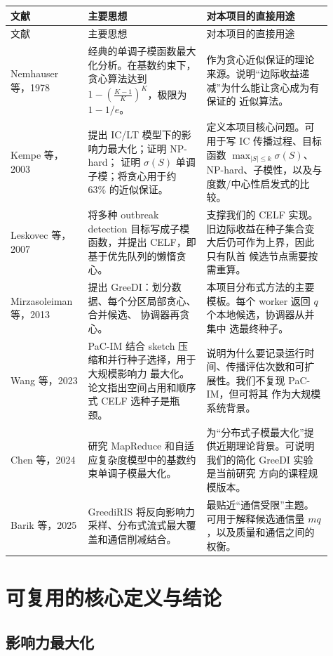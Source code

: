 \documentclass[UTF8,10pt]{ctexart}
\begin{document}
\begin{longtable}{p{0.21\linewidth}p{0.34\linewidth}p{0.36\linewidth}}
\toprule
文献 & 主要思想 & 对本项目的直接用途 \\
\midrule
\endfirsthead
\toprule
文献 & 主要思想 & 对本项目的直接用途 \\
\midrule
\endhead
Nemhauser 等，1978 & 经典的单调子模函数最大化分析。在基数约束下，
贪心算法达到 $1-\left(\frac{K-1}{K}\right)^K$，极限为 $1-1/e$。 &
作为贪心近似保证的理论来源。说明“边际收益递减”为什么能让贪心成为有保证的
近似算法。 \\
\midrule
Kempe 等，2003 & 提出 IC/LT 模型下的影响力最大化；证明 NP-hard；
证明 $\sigma(S)$ 单调子模；将贪心用于约 $63\%$ 的近似保证。 &
定义本项目核心问题。可用于写 IC 传播过程、目标函数
$\max_{|S|\le k}\sigma(S)$、NP-hard、子模性，以及与度数/中心性启发式的比较。 \\
\midrule
Leskovec 等，2007 & 将多种 outbreak detection 目标写成子模函数，并提出
CELF，即基于优先队列的懒惰贪心。 &
支撑我们的 CELF 实现。旧边际收益在种子集合变大后仍可作为上界，因此只有队首
候选节点需要按需重算。 \\
\midrule
Mirzasoleiman 等，2013 & 提出 GreeDI：划分数据、每个分区局部贪心、合并候选、
协调器再贪心。 &
本项目分布式方法的主要模板。每个 worker 返回 $q$ 个本地候选，协调器从并集中
选最终种子。 \\
\midrule
Wang 等，2023 & PaC-IM 结合 sketch 压缩和并行种子选择，用于大规模影响力
最大化。论文指出空间占用和顺序式 CELF 选种子是瓶颈。 &
说明为什么要记录运行时间、传播评估次数和可扩展性。我们不复现 PaC-IM，但可将其
作为大规模系统背景。 \\
\midrule
Chen 等，2024 & 研究 MapReduce 和自适应复杂度模型中的基数约束单调子模最大化。 &
为“分布式子模最大化”提供近期理论背景。可说明我们的简化 GreeDI 实验是当前研究
方向的课程规模版本。 \\
\midrule
Barik 等，2025 & GreediRIS 将反向影响力采样、分布式流式最大覆盖和通信削减结合。 &
最贴近“通信受限”主题。可用于解释候选通信量 $mq$，以及质量和通信之间的权衡。 \\
\bottomrule
\end{longtable}

\section{可复用的核心定义与结论}

\subsection{影响力最大化}
\end{document}
